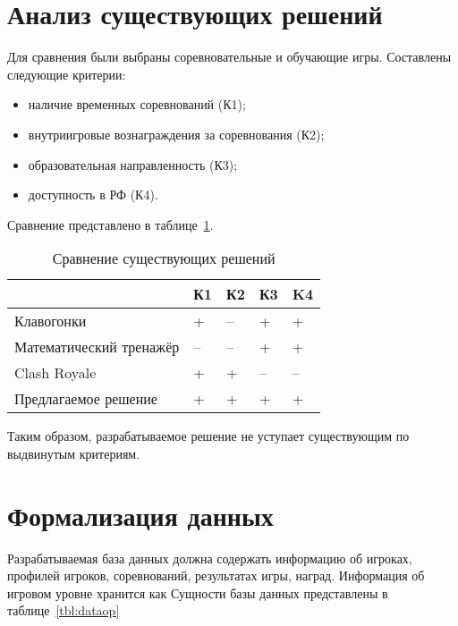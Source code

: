 \section{Анализ существующих решений}

Для сравнения были выбраны соревновательные и обучающие игры. Составлены следующие критерии:
\begin{itemize}
	\item наличие временных соревнований (К1);
	\item внутриигровые вознаграждения за соревнования (К2);
	\item образовательная направленность (К3);
	\item доступность в РФ (К4).
\end{itemize}

Сравнение представлено в таблице~\ref{tbl:comparison}. 

\begin{table}[h!]
	\centering
	\caption{\label{tbl:comparison}Сравнение существующих решений}
	\begin{tabular}{|l|l|l|l|l|}
		\hline
		& К1 & К2 & К3 & K4\\\hline
		Клавогонки & + & -- & + & + \\\hline
		Математический тренажёр & -- & -- & + & +\\\hline
		Clash Royale  & + & + & -- & --\\\hline
		Предлагаемое решение & + & + & + & + \\\hline
	\end{tabular}
\end{table}
\FloatBarrier

Таким образом, разрабатываемое решение не уступает существующим по выдвинутым критериям.

\section{Формализация данных}
Разрабатываемая база данных должна содержать информацию об игроках, профилей игроков, соревнований, результатах игры, наград. Информация об игровом уровне хранится как Сущности базы данных представлены в таблице~\ref{tbl:dataop}

